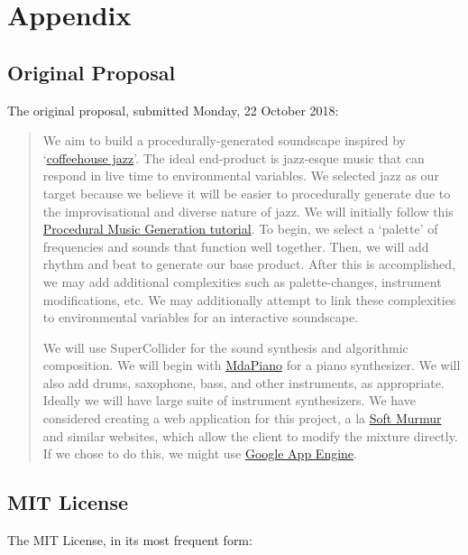 \documentclass[12pt,a4paper]{article}
\begin{document}
\section{Appendix}

\subsection{Original Proposal}
The original proposal, submitted Monday, 22 October 2018:
\begin{quote}
We aim to build a procedurally-generated soundscape inspired by `\href{https://www.youtube.com/watch?v=K2Q6YO3Ez44}{coffeehouse jazz}'. The ideal end-product is jazz-esque music that can respond in live time to environmental variables. We selected jazz as our target because we believe it will be easier to procedurally generate due to the improvisational and diverse nature of jazz. We will initially follow this \href{http://www.procjam.com/tutorials/en/music/}{Procedural Music Generation tutorial}. To begin, we select a `palette' of frequencies and sounds that function well together. Then, we will add rhythm and beat to generate our base product. After this is accomplished, we may add additional complexities such as palette-changes, instrument modifications, etc. We may additionally attempt to link these complexities to environmental variables for an interactive soundscape.

We will use SuperCollider for the sound synthesis and algorithmic composition. We will begin with \href{http://doc.sccode.org/Classes/MdaPiano.html}{MdaPiano} for a piano synthesizer. We will also add drums, saxophone, bass, and other instruments, as appropriate. Ideally we will have large suite of instrument synthesizers. We have considered creating a web application for this project, a la \href{https://asoftmurmur.com/}{Soft Murmur} and similar websites, which allow the client to modify the mixture directly. If we chose to do this, we might use \href{https://console.cloud.google.com/projectselector/appengine}{Google App Engine}.
\end{quote}

\subsection{MIT License}
The MIT License, in its most frequent form:
\end{document}
